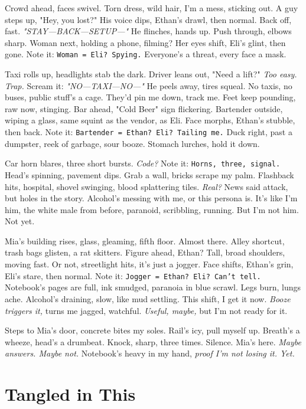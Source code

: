 \documentclass[12pt]{article}
\newcommand{\note}[1]{\texttt{#1}}
\begin{document}
{Crowd ahead, faces swivel. Torn dress, wild hair, I’m a mess, sticking out. A guy steps up, "Hey, you lost?" His voice dips, \textnormal{Ethan}’s drawl, then normal. Back off, fast. \textit{"STAY—BACK—SETUP—"} He flinches, hands up. Push through, elbows sharp. Woman next, holding a phone, filming? Her eyes shift, \textnormal{Eli}’s glint, then gone. Note it: \note{Woman = Eli? Spying.} Everyone’s a threat, every face a mask.

Taxi rolls up, headlights stab the dark. Driver leans out, "Need a lift?" \textit{Too easy. Trap.} Scream it: \textit{"NO—TAXI—NO—"} He peels away, tires squeal. No taxis, no buses, public stuff’s a cage. They’d pin me down, track me. Feet keep pounding, raw now, stinging. Bar ahead, "Cold Beer" sign flickering. Bartender outside, wiping a glass, same squint as the vendor, as \textnormal{Eli}. Face morphs, \textnormal{Ethan}’s stubble, then back. Note it: \note{Bartender = Ethan? Eli? Tailing me.} Duck right, past a dumpster, reek of garbage, sour booze. Stomach lurches, hold it down.

Car horn blares, three short bursts. \textit{Code?} Note it: \note{Horns, three, signal.} Head’s spinning, pavement dips. Grab a wall, bricks scrape my palm. Flashback hits, hospital, shovel swinging, blood splattering tiles. \textit{Real?} News said attack, but holes in the story. Alcohol’s messing with me, or this persona is. It’s like I’m him, the white male from before, paranoid, scribbling, running. But I’m not him. Not yet.

\textnormal{Mia}’s building rises, glass, gleaming, fifth floor. Almost there. Alley shortcut, trash bags glisten, a rat skitters. Figure ahead, \textnormal{Ethan}? Tall, broad shoulders, moving fast. Or not, streetlight hits, it’s just a jogger. Face shifts, \textnormal{Ethan}’s grin, \textnormal{Eli}’s stare, then normal. Note it: \note{Jogger = Ethan? Eli? Can’t tell.} Notebook’s pages are full, ink smudged, paranoia in blue scrawl. Legs burn, lungs ache. Alcohol’s draining, slow, like mud settling. This shift, I get it now. \textit{Booze triggers it,} turns me jagged, watchful. \textit{Useful, maybe,} but I’m not ready for it.

Steps to \textnormal{Mia}’s door, concrete bites my soles. Rail’s icy, pull myself up. Breath’s a wheeze, head’s a drumbeat. Knock, sharp, three times. Silence. \textnormal{Mia}’s here. \textit{Maybe answers. Maybe not.} Notebook’s heavy in my hand, \textit{proof I’m not losing it. Yet.}

\section{Tangled in This}

}
\end{document}
